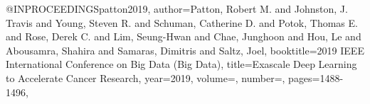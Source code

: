 @INPROCEEDINGS{patton2019,
  author={Patton, Robert M. and Johnston, J. Travis and Young, Steven R. and Schuman, Catherine D. and
  Potok, Thomas E. and Rose, Derek C. and Lim, Seung-Hwan and Chae, Junghoon and Hou, Le and 
  Abousamra, Shahira and Samaras, Dimitris and Saltz, Joel},
  booktitle={2019 IEEE International Conference on Big Data (Big Data)}, 
  title={Exascale Deep Learning to Accelerate Cancer Research}, 
  year={2019},
  volume={},
  number={},
  pages={1488-1496},
}
